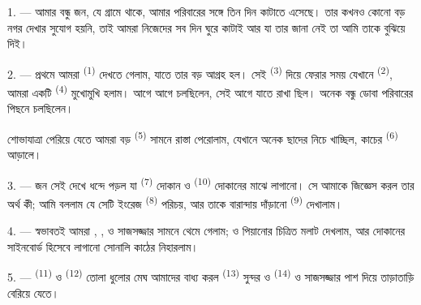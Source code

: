 %

\VUsaut{4.0mm}
\VUsaut{3.0mm}

\VUsaut{3.0mm}

1. --- আমার বন্ধু জন, যে গ্রামে থাকে, আমার পরিবারের সঙ্গে তিন দিন কাটাতে
এসেছে।  তার কখনও কোনো বড় নগর দেখার সুযোগ হয়নি, তাই আমরা
নিজেদের সব দিন ঘুরে কাটাই আর যা তার জানা নেই তা আমি তাকে বুঝিয়ে দিই।

2. --- প্রথমে আমরা  \textsuperscript{(1)} দেখতে গেলাম, যাতে তার
বড় আগ্রহ হল। সেই  \textsuperscript{(3)} দিয়ে ফেরার সময় যেখানে
 \textsuperscript{(2)}, আমরা একটি 
\textsuperscript{(4)} মুখোমুখি হলাম।  আগে আগে
 চলছিলেন, সেই  আগে যাতে  রাখা
ছিল। অনেক বন্ধু  ডোবা পরিবারের পিছনে চলছিলেন।

শোভাযাত্রা পেরিয়ে যেতে আমরা বড়  \textsuperscript{(5)}
সামনে রাস্তা পেরোলাম, যেখানে অনেক  ছাদের নিচে 
খাচ্ছিল, কাচের  \textsuperscript{(6)} আড়ালে।

3. --- জন সেই  দেখে ধন্দে পড়ল যা 
\textsuperscript{(7)} দোকান ও  \textsuperscript{(10)}
দোকানের মাঝে লাগানো। সে আমাকে জিজ্ঞেস করল তার অর্থ কী; আমি বললাম যে সেটি
ইংরেজ  \textsuperscript{(8)} পরিচয়, আর তাকে বারান্দায়
দাঁড়ানো  \textsuperscript{(9)} দেখালাম।

\VUsaut{3.0mm}

4. --- স্বভাবতই আমরা , ,
 ও  সাজসজ্জার সামনে থেমে গেলাম;
 ও পিয়ানোর  চিত্রিত মলাট দেখলাম, আর দোকানের
সাইনবোর্ড হিসেবে লাগানো সোনালি কাঠের  নিহারলাম।

5. ---  \textsuperscript{(11)} ও 
\textsuperscript{(12)} তোলা ধুলোর মেঘ আমাদের বাধ্য করল 
\textsuperscript{(13)} সুন্দর  ও 
\textsuperscript{(14)}  ও  সাজসজ্জার পাশ দিয়ে
তাড়াতাড়ি বেরিয়ে যেতে।

